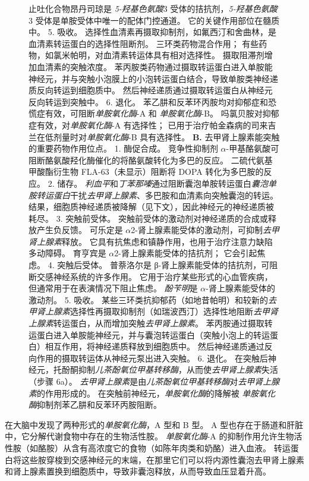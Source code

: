 \begin{figure}[htbp]
{	止吐化合物昂丹司琼是 \textit{5-羟基色氨酸}3 受体的拮抗剂，\textit{5-羟基色氨酸}3 受体是单胺受体中唯一的配体门控通道。
	它的关键作用部位在髓质中。
	5. 吸收。
	选择性血清素再摄取抑制剂，如氟西汀和舍曲林，是血清素转运蛋白的选择性阻断剂。
	三环类药物混合作用；
	有些药物，如氯米帕明，对血清素转运体具有相对选择性。
	摄取阻滞剂增加血清素的突触浓度。
	苯丙胺类药物通过摄取转运蛋白进入单胺能神经元，并与突触小泡膜上的小泡转运蛋白结合，导致单胺类神经递质反向转运到细胞质中。
	然后神经递质通过摄取转运蛋白从神经元反向转运到突触中。
	6. 退化。
	苯乙肼和反苯环丙胺均对抑郁症和恐慌症有效，可阻断\textit{单胺氧化酶}-A 和 \textit{单胺氧化酶}-B。
	吗氯贝胺对抑郁症有效，对\textit{单胺氧化酶}-A 有选择性；
	已用于治疗帕金森病的司来吉兰在低剂量时对\textit{单胺氧化酶}-B 具有选择性。 
	\textbf{B.} 去甲肾上腺素能突触的重要药物作用位点。 
	1. 酶促合成。
	竞争性抑制剂 $\alpha$-甲基酪氨酸可阻断酪氨酸羟化酶催化的将酪氨酸转化为多巴的反应。
	二硫代氨基甲酸酯衍生物 FLA-63（未显示）阻断将 DOPA 转化为多巴胺的反应。
	2. 储存。
	\textit{利血平}和\textit{丁苯那嗪}通过阻断囊泡单胺转运蛋白\textit{囊泡单胺转运蛋白}干扰\textit{去甲肾上腺素}、多巴胺和血清素向突触囊泡的转运。
	结果，细胞质神经递质被降解（见下文），因此神经元的神经递质被耗尽。
	3. 突触前受体。
	突触前受体的激动剂对神经递质的合成或释放产生负反馈。
	可乐定是 $\alpha$2-肾上腺素能受体的激动剂，可抑制\textit{去甲肾上腺素}释放。
	它具有抗焦虑和镇静作用，也用于治疗注意力缺陷多动障碍。
	育亨宾是 $\alpha$2-肾上腺素能受体的拮抗剂； 它会引起焦虑。
	4. 突触后受体。
	普萘洛尔是 β-肾上腺素能受体的拮抗剂，可阻断交感神经系统的许多作用。
	它用于治疗某些形式的心血管疾病，但通常用于在表演情况下阻止焦虑。
	\textit{酚苄明}是 $\alpha$-肾上腺素能受体的激动剂。
	5. 吸收。
	某些三环类抗抑郁药（如地昔帕明）和较新的\textit{去甲肾上腺素}选择性再摄取抑制剂（如瑞波西汀）选择性地阻断\textit{去甲肾上腺素}转运蛋白，从而增加突触\textit{去甲肾上腺素}。
	苯丙胺通过摄取转运蛋白进入单胺能神经元，并与囊泡转运蛋白（突触小泡上的转运蛋白）相互作用，将神经递质释放到细胞质中。
	然后神经递质通过反向作用的摄取转运体从神经元泵出进入突触。
	6. 退化。
	在突触后神经元，托酚酮抑制\textit{儿茶酚氧位甲基转移酶}，从而使\textit{去甲肾上腺素}失活（步骤 6a）。
	\textit{去甲肾上腺素}是由\textit{儿茶酚氧位甲基转移酶}对\textit{去甲肾上腺素}的作用形成的。
	在突触前神经元，\textit{单胺氧化酶}的降解被 \textit{单胺氧化酶}抑制剂苯乙肼和反苯环丙胺阻断。}
\end{figure}


在大脑中发现了两种形式的\textit{单胺氧化酶}，A 型和 B 型。
A 型也存在于肠道和肝脏中，它分解代谢食物中存在的生物活性胺。
\textit{单胺氧化酶}-A 的抑制作用允许生物活性胺（如酪胺）从含有高浓度它的食物（如陈年肉类和奶酪）进入血液。
转运蛋白将这些胺穿梭到交感神经元的末端，在那里它们可以将内源性囊泡去甲肾上腺素和肾上腺素置换到细胞质中，导致非囊泡释放，从而导致血压显着升高。


